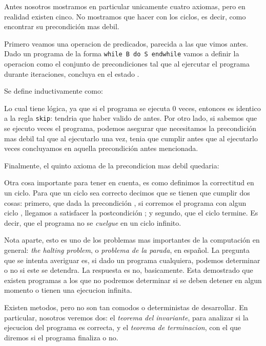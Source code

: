 \documentclass{article}
\begin{document}
Antes nosotros mostramos en particular unicamente cuatro axiomas, pero en realidad existen cinco. No mostramos que hacer con los ciclos, es decir, como encontrar su precondición mas debil.

Primero veamos una operacion de predicados, parecida a las que vimos antes. Dado un programa de la forma \texttt{while B do S endwhile} vamos a definir la operacion  como el conjunto de precondiciones tal que al ejercutar el programa durante  iteraciones, concluya en el estado .

Se define inductivamente como:



Lo cual tiene lógica, ya que si el programa se ejecuta 0 veces, entonces es identico a la regla \texttt{skip}:  tendria que haber valido de antes. Por otro lado, si sabemos que se ejecuto  veces el programa, podemos asegurar que necesitamos la precondición mas debil tal que al ejecutarlo una vez, tenia que cumplir antes que al ejecutarlo  veces concluyamos en aquella precondición antes mencionada.

Finalmente, el quinto axioma de la precondicion mas debil quedaria:


Otra cosa importante para tener en cuenta, es como definimos la correctitud en un ciclo. Para que un ciclo sea correcto decimos que se tienen que cumplir dos cosas: primero, que dada la precondición , si corremos el programa con algun ciclo , llegamos a satisfacer la postcondición ; y segundo, que el ciclo termine. Es decir, que el programa no se \textit{cuelgue} en un ciclo infinito.

Nota aparte, esto es uno de los problemas mas importantes de la computación en general: \textit{the halting problem}, o \textit{problema de la parada}, en español. La pregunta que se intenta averiguar es, si dado un programa cualquiera, podemos determinar o no si este se detendra. La respuesta es no, basicamente. Esta demostrado que existen programas a los que no podremos determinar si se deben detener en algun momento o tienen una ejecucion infinita.

Existen metodos, pero no son tan comodos o deterministas de desarrollar. En particular, nosotros veremos dos: el \textit{teorema del invariante}, para analizar si la ejecucion del programa es correcta, y el \textit{teorema de terminacion}, con el que diremos si el programa finaliza o no.
\end{document}
